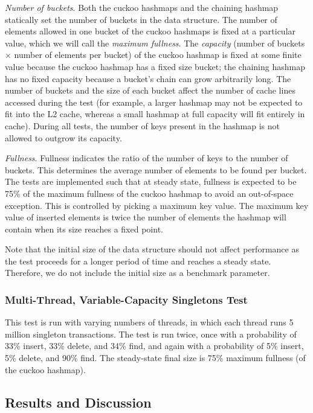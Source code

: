 \emph{Number of buckets}. Both the cuckoo hashmaps and the chaining hashmap statically set the number of buckets in the data structure. The number of elements allowed in one bucket of the cuckoo hashmaps is fixed at a particular value, which we will call the \emph{maximum fullness}. 
        The \emph{capacity} (number of buckets $\times$ number of elements per bucket) of the cuckoo hashmap is fixed at some finite value because the cuckoo hashmap has a fixed size bucket; the chaining hashmap has no fixed capacity because a bucket's chain can grow arbitrarily long.
        The number of buckets and the size of each bucket affect the number of cache lines accessed during the test (for example, a larger hashmap may not be expected to fit into the L2 cache, whereas a small hashmap at full capacity will fit entirely in cache). During all tests, the number of keys present in the hashmap is not allowed to outgrow its capacity.
    
    \emph{Fullness}. Fullness indicates the ratio of the number of keys to the number of buckets. This determines the average number of elements to be found per bucket. The tests are implemented such that at steady state, fullness is expected to be 75\% of the maximum fullness of the cuckoo hashmap to avoid an out-of-space exception. This is controlled by picking a maximum key value. The maximum key value of inserted elements is twice the number of elements the hashmap will contain when its size reaches a fixed point.

        Note that the initial size of the data structure should not affect performance as the test proceeds for a longer period of time and reaches a steady state. Therefore, we do not include the initial size as a benchmark parameter.

\subsubsection{Multi-Thread, Variable-Capacity Singletons Test} 
This test is run with varying numbers of threads, in which each thread runs 5 million singleton transactions.
The test is run twice, once with a probability of 33\% insert, 33\% delete, and 34\% find, and again with a probability of 5\% insert, 5\% delete, and 90\% find. The steady-state final size is 75\% maximum fullness (of the cuckoo hashmap).

\subsection{Results and Discussion}

